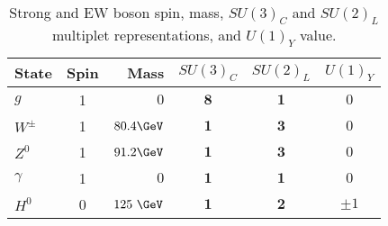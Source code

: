 \begin{table}[!htp]
\centering
\small
\begin{tabular}{|lcrccc|}
\hline
State  & Spin & Mass &  $SU(3)_{C}$ &  $SU(2)_{L}$ & $U(1)_{Y}$ \\
\hline \hline
$g$ & 1&  $0$ & $\mathbf{8}$ & $\mathbf{1}$ & $0$ \\ 
\hline
$W^\pm$ & 1 & $80.4\GeV$ & $\mathbf{1}$  &$\mathbf{3}$ & $0$  \\  
$Z^0$ & 1 & $91.2\GeV$ & $\mathbf{1}$ & $\mathbf{3}$ &  $0$\\ 
$\gamma$ & 1 & $0$ & $\mathbf{1}$ & $\mathbf{1}$ &$0$ \\  
\hline
$H^0$& 0 & $125~\GeV$&$\mathbf{1}$& $\mathbf{2}$& $\pm1$\\
\hline 

\hline
\end{tabular}
\caption{Strong and EW boson spin, mass, $SU(3)_{C}$ and $SU(2)_{L}$ multiplet representations, and $U(1)_{Y}$ value. }
\label{tab:boson}
\end{table} 

